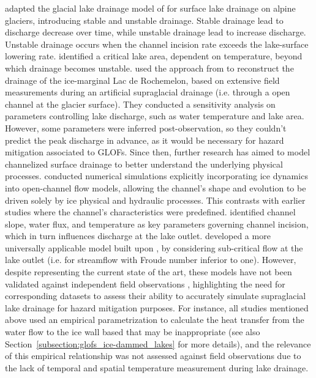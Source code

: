 \cite{Raymond&Nolan2000} adapted the glacial lake drainage model of \cite{Walder&Costa1996} for surface lake drainage on alpine glaciers, introducing stable and unstable drainage. Stable drainage lead to discharge decrease over time, while unstable drainage lead to increase discharge. Unstable drainage occurs when the channel incision rate exceeds the lake-surface lowering rate. \cite{Raymond&Nolan2000} identified a critical lake area, dependent on temperature, beyond which drainage becomes unstable. \cite{Vincent&al2010} used the approach from \cite{Raymond&Nolan2000} to reconstruct the drainage of the ice-marginal Lac de Rochemelon, based on extensive field measurements during an artificial supraglacial drainage (i.e. through a open channel at the glacier surface). They conducted a sensitivity analysis on parameters controlling lake discharge, such as water temperature and lake area. However, some parameters were inferred post-observation, so they couldn't predict the peak discharge in advance, as it would be necessary for hazard mitigation associated to GLOFs. Since then, further research has aimed to model channelized surface drainage to better understand the underlying physical processes. \cite{Jarosch&Gudmundsson2012} conducted numerical simulations explicitly incorporating ice dynamics into open-channel flow models, allowing the channel's shape and evolution to be driven solely by ice physical and hydraulic processes. This contrasts with earlier studies \citep{Walder&Costa1996, Raymond&Nolan2000} where the channel's characteristics were predefined. \cite{Jarosch&Gudmundsson2012} identified channel slope, water flux, and temperature as key parameters governing channel incision, which in turn influences discharge at the lake outlet. \cite{Kingslake&al2015} developed a more universally applicable model built upon \cite{Raymond&Nolan2000}, by considering sub-critical flow at the lake outlet (i.e. for streamflow with Froude number inferior to one). However, despite representing the current state of the art, these models have not been validated against independent field observations \citep{Pitcher&Smith2019}, highlighting the need for corresponding datasets to assess their ability to accurately simulate supraglacial lake drainage for hazard mitigation purposes. For instance, all studies mentioned above used an empirical parametrization to calculate the heat transfer from the water flow to the ice wall based that may be inappropriate (see also Section~\ref{subsection:glofs_ice-dammed_lakes} for more details), and the relevance of this empirical relationship was not assessed against field observations due to the lack of temporal and spatial temperature measurement during lake drainage. 

